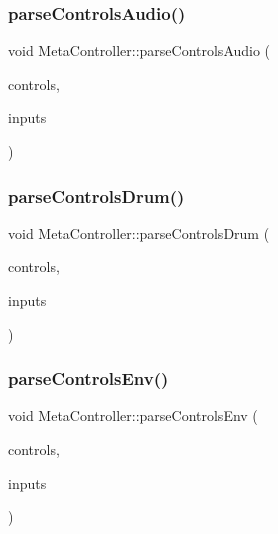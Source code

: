 \subsubsection{\texorpdfstring{parse\+Controls\+Audio()}{parseControlsAudio()}}
{\footnotesize\ttfamily void Meta\+Controller\+::parse\+Controls\+Audio (\begin{DoxyParamCaption}\item[{\mbox{\hyperlink{class_via_controls}{Via\+Controls}} $\ast$}]{controls,  }\item[{\mbox{\hyperlink{class_via_input_streams}{Via\+Input\+Streams}} $\ast$}]{inputs }\end{DoxyParamCaption})}

\mbox{\label{class_meta_controller_a557b81488e8c917eaacf8ae65fd85724}} 
\subsubsection{\texorpdfstring{parse\+Controls\+Drum()}{parseControlsDrum()}}
{\footnotesize\ttfamily void Meta\+Controller\+::parse\+Controls\+Drum (\begin{DoxyParamCaption}\item[{\mbox{\hyperlink{class_via_controls}{Via\+Controls}} $\ast$}]{controls,  }\item[{\mbox{\hyperlink{class_via_input_streams}{Via\+Input\+Streams}} $\ast$}]{inputs }\end{DoxyParamCaption})}

\mbox{\label{class_meta_controller_a5f3e148b9730b47b9d3105d39dd88938}} 
\subsubsection{\texorpdfstring{parse\+Controls\+Env()}{parseControlsEnv()}}
{\footnotesize\ttfamily void Meta\+Controller\+::parse\+Controls\+Env (\begin{DoxyParamCaption}\item[{\mbox{\hyperlink{class_via_controls}{Via\+Controls}} $\ast$}]{controls,  }\item[{\mbox{\hyperlink{class_via_input_streams}{Via\+Input\+Streams}} $\ast$}]{inputs }\end{DoxyParamCaption})}

